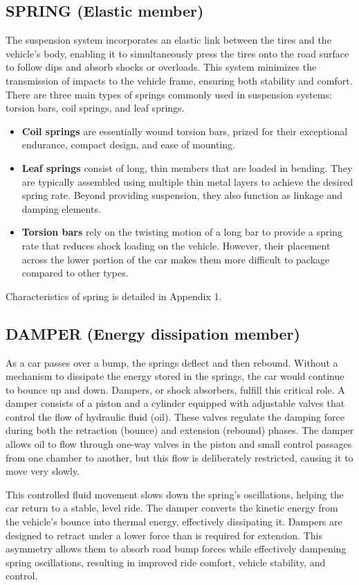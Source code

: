 \subsection{SPRING (Elastic member)}
The suspension system incorporates an elastic link between the tires and the vehicle's body, enabling it to simultaneously press the tires onto the road surface to follow dips and absorb shocks or overloads. This system minimizes the transmission of impacts to the vehicle frame, ensuring both stability and comfort. There are three main types of springs commonly used in suspension systems: torsion bars, coil springs, and leaf springs.
	\begin{itemize}
		\item \textbf{Coil springs} are essentially wound torsion bars, prized for their exceptional endurance, compact design, and ease of mounting.
		\item \textbf{Leaf springs} consist of long, thin members that are loaded in bending. They are typically assembled using multiple thin metal layers to achieve the desired spring rate. Beyond providing suspension, they also function as linkage and damping elements.
		\item \textbf{Torsion bars} rely on the twisting motion of a long bar to provide a spring rate that reduces shock loading on the vehicle. However, their placement across the lower portion of the car makes them more difficult to package compared to other types. \cite{trzesniowski2023suspension} 
	\end{itemize}
Characteristics of spring is detailed in Appendix 1.

\subsection{DAMPER (Energy dissipation member)}
As a car passes over a bump, the springs deflect and then rebound. Without a mechanism to dissipate the energy stored in the springs, the car would continue to bounce up and down. Dampers, or shock absorbers, fulfill this critical role. A damper consists of a piston and a cylinder equipped with adjustable valves that control the flow of hydraulic fluid (oil). These valves regulate the damping force during both the retraction (bounce) and extension (rebound) phases. The damper allows oil to flow through one-way valves in the piston and small control passages from one chamber to another, but this flow is deliberately restricted, causing it to move very slowly.

This controlled fluid movement slows down the spring's oscillations, helping the car return to a stable, level ride. The damper converts the kinetic energy from the vehicle's bounce into thermal energy, effectively dissipating it. Dampers are designed to retract under a lower force than is required for extension. This asymmetry allows them to absorb road bump forces while effectively dampening spring oscillations, resulting in improved ride comfort, vehicle stability, and control. \cite{barton2018automotive}\\

